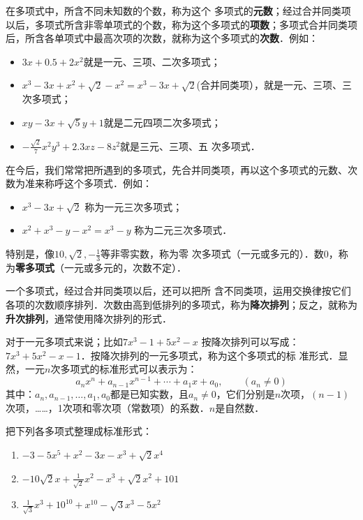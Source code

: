 在多项式中，所含不同未知数的个数，称为这个
多项式的\textbf{元数}；经过合并同类项以后，多项式所含非零单项式的个数，称为这个多项式的\textbf{项数}；多项式合并同类项后，所含各单项式中最高次项的次数，就称为这个多项式的\textbf{次数}．例如：
\begin{itemize}
    \item $3x+0.5+2x^2$就是一元、三项、二次多项式；
    \item $x^3-3x+x^2+\sqrt{2}-x^2=x^3-3x+\sqrt{2}$(合并同类项），就是一元、三项、三次多项式；
    \item $xy-3x+\sqrt{5}y+1$就是二元四项二次多项式；
    \item $-\frac{\sqrt{2}}{7}x^2y^3 +2.3xz-8z^2$就是三元、三项、五
次多项式．
\end{itemize}

在今后，我们常常把所遇到的多项式，先合并同类项，再以这个多项式的元数、次数为准来称呼这个多项式．例如：
\begin{itemize}
    \item $x^3-3x+\sqrt{2}$ 称为一元三次多项式；
    \item $x^2+x^3-y-x^2=x^3-y$ 称为二元三次多项式．
\end{itemize}
特别是，像$10,\sqrt{2},-\frac{1}{3}$等非零实数，称为零
次多项式（一元或多元的）．数0，称为\textbf{零多项式}（一元或多元的，次数不定）．

一个多项式，经过合并同类项以后，还可以把所
含不同类项，运用交换律按它们各项的次数顺序排列．次数由高到低排列的多项式，称为\textbf{降次排列}；反之，就称为\textbf{升次排列}，通常使用降次排列的形式．

对于一元多项式来说；比如$7x^3-1+5x^2-x$ 按降次排列可以写成：
$7x^3+5x^2-x-1$．按降次排列的一元多项式，称为这个多项式的标
准形式．显然，一元$n$次多项式的标准形式可以表示为：
\[a_nx^n+a_{n-1}x^{n-1}+\cdots +a_1x+a_0,\qquad (a_n\ne 0) \]
其中：$a_n,a_{n-1},\ldots,a_1,a_0$都是已知实数，且$a_n\ne 0$，它们分别是$n$次项，$(n-1)$次项，……，1次项和零次项（常数项）的系数．$n$是自然数．

\begin{example}
    把下列各多项式整理成标准形式：
    \begin{enumerate}
        \item $-3-5x^5+x^2-3x-x^3+\sqrt{2}x^4$
        \item $-10\sqrt{2}x+\frac{1}{\sqrt{2}}x^2-x^3+\sqrt{2}x^2+101$
        \item $\frac{1}{\sqrt{3}}x^3+10^{10}+x^{10}-\sqrt{3}x^3-5x^2$
    \end{enumerate}
\end{example}

